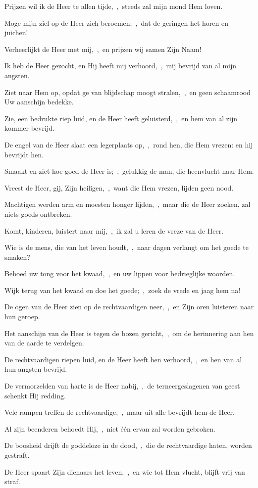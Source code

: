 \documentclass[12pt,twoside,a5paper]{article}
\begin{document}
\begin{halfparskip}
  Prijzen wil ik de Heer te allen tijde,~\sep\ steeds zal mijn mond Hem loven.


  Moge mijn ziel op de Heer zich beroemen;~\sep\ dat de geringen het horen en juichen!

  Verheerlijkt de Heer met mij,~\sep\ en prijzen wij samen Zijn Naam!

  Ik heb de Heer gezocht, en Hij heeft mij verhoord,~\sep\ mij bevrijd van al mijn angsten.

  Ziet naar Hem op, opdat ge van blijdschap moogt stralen,~\sep\ en geen schaamrood Uw aanschijn bedekke.

  Zie, een bedrukte riep luid, en de Heer heeft geluisterd,~\sep\ en hem van al zijn kommer bevrijd.

  De engel van de Heer slaat een legerplaats op,~\sep\ rond hen, die Hem vrezen: en hij bevrijdt hen.

  Smaakt en ziet hoe goed de Heer is;~\sep\ gelukkig de man, die heenvlucht naar Hem.

  Vreest de Heer, gij, Zijn heiligen,~\sep\ want die Hem vrezen, lijden geen nood.

  Machtigen werden arm en moesten honger lijden,~\sep\ maar die de Heer zoeken, zal niets goeds ontbreken.
\end{halfparskip}


\begin{halfparskip}
  Komt, kinderen, luistert naar mij,~\sep\ ik zal u leren de vreze van de Heer.

  Wie is de mens, die van het leven houdt,~\sep\ naar dagen verlangt om het goede te smaken?

  Behoed uw tong voor het kwaad,~\sep\ en uw lippen voor bedrieglijke woorden.

  Wijk terug van het kwaad en doe het goede;~\sep\ zoek de vrede en jaag hem na!

  De ogen van de Heer zien op de rechtvaardigen neer,~\sep\ en Zijn oren luisteren naar hun geroep.

  Het aanschijn van de Heer is tegen de bozen gericht,~\sep\ om de herinnering aan hen van de aarde te verdelgen.

  De rechtvaardigen riepen luid, en de Heer heeft hen verhoord,~\sep\ en hen van al hun angsten bevrijd.

  De vermorzelden van harte is de Heer nabij,~\sep\ de terneergeslagenen van geest schenkt Hij redding.

  Vele rampen treffen de rechtvaardige,~\sep\ maar uit alle bevrijdt hem de Heer.

  Al zijn beenderen behoedt Hij,~\sep\ niet één ervan zal worden gebroken.

  De boosheid drijft de goddeloze in de dood,~\sep\ die de rechtvaardige haten, worden gestraft.

  De Heer spaart Zijn dienaars het leven,~\sep\ en wie tot Hem vlucht, blijft vrij van straf.
\end{halfparskip}
\end{document}
